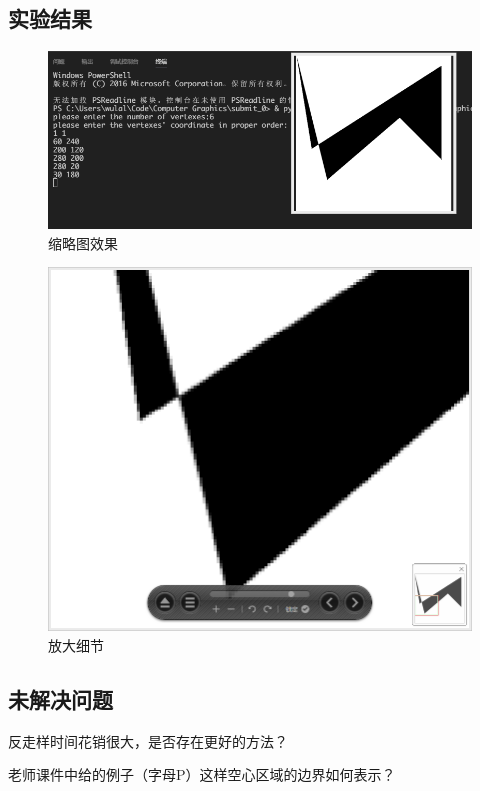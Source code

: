\documentclass[11pt,UTF8]{article}
\begin{document}
\subsection{实验结果}
	\begin{figure}[H]
		\centering
		\includegraphics[width=\textwidth]{demo0.png}
		\caption{缩略图效果}\label{results}
	\end{figure}
	\begin{figure}[H]
		\centering
		\includegraphics[width=\textwidth]{demo1.png}
		\caption{放大细节}\label{results}
	\end{figure}

\subsection{未解决问题}
	反走样时间花销很大，是否存在更好的方法？

	老师课件中给的例子（字母P）这样空心区域的边界如何表示？
\newpage
		
\end{document}

